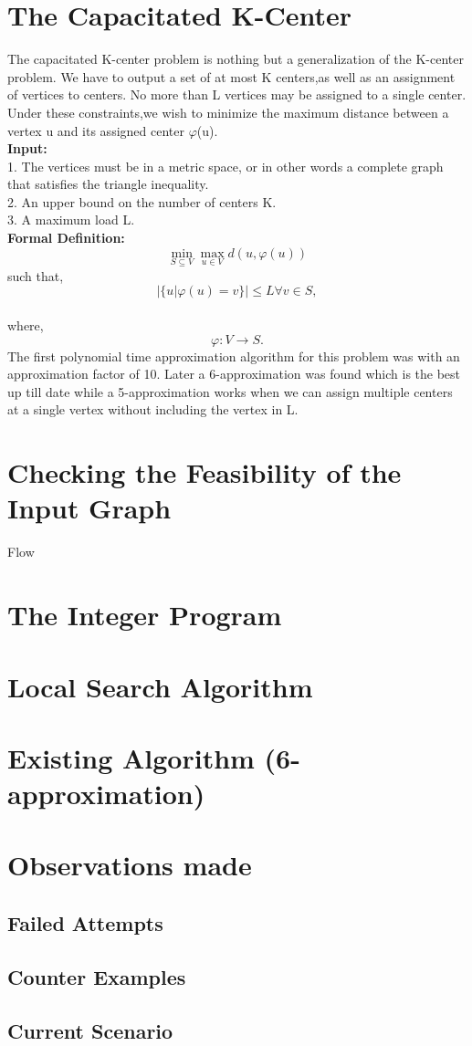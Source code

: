 \documentclass[12pt,a4paper,onecolumn]{article}
\begin{document}
\section{The Capacitated K-Center}
The capacitated K-center problem is nothing but a generalization of the K-center problem. We have to
output a set of at most K centers,as well as an assignment of vertices to centers. No more than L vertices may be assigned to a single center. Under these constraints,we
wish to minimize the maximum distance between a vertex u and its assigned center
$\varphi$(u). \\
\textbf{Input:}\\1. The vertices must be in a metric space, or in other words a complete graph that satisfies the triangle inequality.\\2. An
upper bound on the number of centers K.\\3. A maximum load L.\\\textbf{Formal Definition:}\\
$$ \min_{S \subseteq V}\max_{u \in V}d(u,\varphi(u)) $$such that,   $$|\{u|\varphi(u) = v\}|\leq L \forall v \in S,$$\\where,   $$\varphi : V \rightarrow S.$$
The first polynomial time approximation
algorithm for this problem was with an approximation factor of 10. Later a 6-approximation was found which is the best up till date while a 5-approximation works when we can assign multiple centers at a single vertex without including the vertex in L.

\section{Checking the Feasibility of the Input Graph}
Flow
\section{The Integer Program}
\section{Local Search Algorithm}
\section{Existing Algorithm (6-approximation)}
\section{Observations made}
\subsection{Failed Attempts}
\subsection{Counter Examples}
\subsection{Current Scenario}
\end{document}
